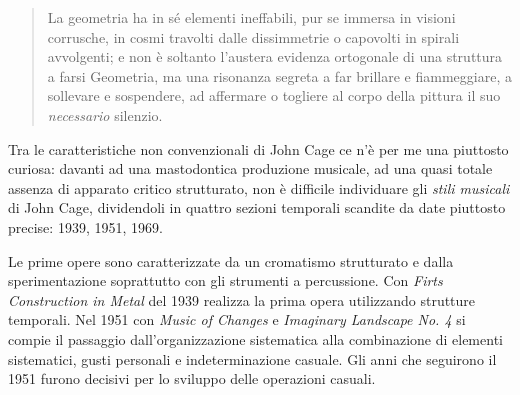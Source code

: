 \begin{multicols}{2}
\begin{quote}
	La geometria ha in s\'e elementi ineffabili, pur se immersa in visioni corrusche, in cosmi
	travolti dalle dissimmetrie o capovolti in spirali avvolgenti; e non \`e soltanto
	l'austera evidenza ortogonale di una struttura a farsi Geometria, ma una risonanza segreta
	a far brillare e fiammeggiare, a sollevare e sospendere, ad affermare o togliere al
	corpo della pittura il suo \emph{necessario} silenzio.
\end{quote}

Tra le caratteristiche non convenzionali di John Cage ce n'\`e per me una piuttosto
curiosa: davanti ad una mastodontica produzione musicale, ad una quasi totale
assenza di apparato critico strutturato, non \`e difficile individuare gli
\emph{stili musicali} di John Cage, dividendoli in quattro sezioni temporali
scandite da date piuttosto precise: 1939, 1951, 1969.

Le prime opere sono caratterizzate da un cromatismo strutturato e dalla
sperimentazione soprattutto con gli strumenti a percussione.
Con \emph{Firts Construction in Metal} del 1939 realizza la prima opera
utilizzando strutture temporali. Nel 1951 con \emph{Music of Changes} e
\emph{Imaginary Landscape No. 4} si compie il passaggio dall'organizzazione
sistematica alla combinazione di elementi sistematici, gusti personali e
indeterminazione casuale. Gli anni che seguirono il 1951 furono decisivi per
lo sviluppo delle operazioni casuali.


\end{multicols}
